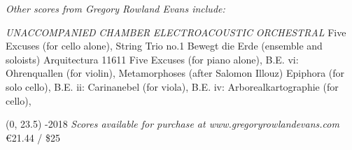 \documentclass[10pt]{article}
\begin{document}
\begin{center}
\textit{\fontsize{.7cm}{1em}\selectfont Other scores from Gregory Rowland Evans include:} \hfill
\end{center}
\vspace*{4\baselineskip}
{
\begin{center}
\begin{paracol}{4}
\textit{\fontsize{.5cm}{1em}\selectfont UNACCOMPANIED}
\switchcolumn
\textit{\fontsize{.5cm}{1em}\selectfont CHAMBER}
\switchcolumn
\textit{\fontsize{.5cm}{1em}\selectfont ELECTROACOUSTIC}
\switchcolumn
\textit{\fontsize{.5cm}{1em}\selectfont ORCHESTRAL}
\switchcolumn
Five Excuses (for cello alone),
\switchcolumn
String Trio no.1
\switchcolumn
Bewegt die Erde (ensemble and soloists)
\switchcolumn
Arquitectura 11611
\switchcolumn
Five Excuses (for piano alone),
\switchcolumn
\switchcolumn
B.E. vi: Ohrenquallen (for violin),
\switchcolumn
Metamorphoses (after Salomon Illouz)
\switchcolumn
 Epiphora (for solo cello),
 \switchcolumn
 \switchcolumn
B.E. ii: Carinanebel (for viola),
\switchcolumn
\switchcolumn
\switchcolumn
\switchcolumn
B.E. iv: Arborealkartographie (for cello),

\end{paracol}
\end{center}
}

\begin{textblock}{23}(0, 23.5)
-2018 \hfill
\textit{Scores available for purchase at www.gregoryrowlandevans.com} \hfill
\euro 21.44 / \$25
\end{textblock}
\end{document}
